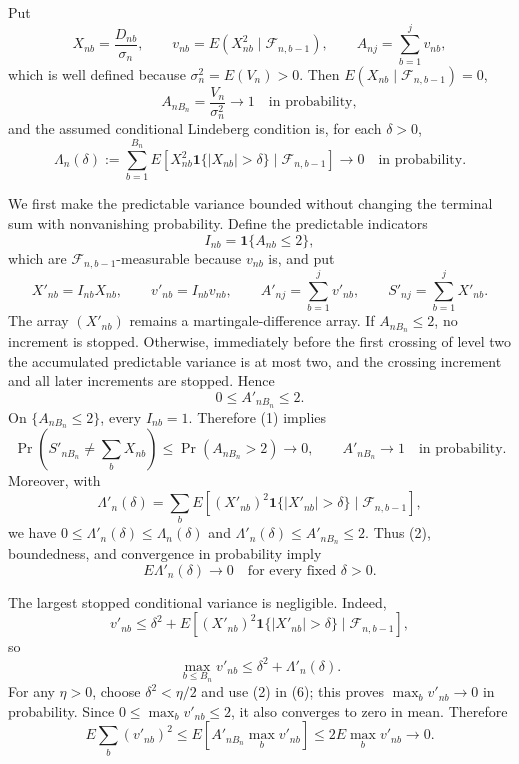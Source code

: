 Put
\[
X_{nb}=\frac{D_{nb}}{\sigma_n},\qquad
v_{nb}=E(X_{nb}^2\mid\mathcal F_{n,b-1}),\qquad
A_{nj}=\sum_{b=1}^{j}v_{nb},
\]
which is well defined because \(\sigma_n^2=E(V_n)>0\). Then \(E(X_{nb}\mid\mathcal F_{n,b-1})=0\),
\[
A_{nB_n}=\frac{V_n}{\sigma_n^2}\longrightarrow1
\quad\text{in probability},
\tag{1}
\]
and the assumed conditional Lindeberg condition is, for each \(\delta>0\),
\[
\Lambda_n(\delta):=\sum_{b=1}^{B_n}
E\!\left[X_{nb}^2\mathbf1\{|X_{nb}|>\delta\}\mid\mathcal F_{n,b-1}\right]
\longrightarrow0
\quad\text{in probability}.
\tag{2}
\]

We first make the predictable variance bounded without changing the terminal sum with nonvanishing probability. Define the predictable indicators
\[
I_{nb}=\mathbf1\{A_{nb}\le2\},
\]
which are \(\mathcal F_{n,b-1}\)-measurable because \(v_{nb}\) is, and put
\[
X'_{nb}=I_{nb}X_{nb},\qquad
v'_{nb}=I_{nb}v_{nb},\qquad
A'_{nj}=\sum_{b=1}^{j}v'_{nb},\qquad
S'_{nj}=\sum_{b=1}^{j}X'_{nb}.
\]
The array \((X'_{nb})\) remains a martingale-difference array. If \(A_{nB_n}\le2\), no increment is stopped. Otherwise, immediately before the first crossing of level two the accumulated predictable variance is at most two, and the crossing increment and all later increments are stopped. Hence
\[
0\le A'_{nB_n}\le2.
\tag{3}
\]
On \(\{A_{nB_n}\le2\}\), every \(I_{nb}=1\). Therefore (1) implies
\[
\Pr\!\left(S'_{nB_n}\ne\sum_bX_{nb}\right)
\le\Pr(A_{nB_n}>2)\longrightarrow0,
\qquad
A'_{nB_n}\longrightarrow1
\quad\text{in probability}.
\tag{4}
\]
Moreover, with
\[
\Lambda'_n(\delta)=\sum_bE\!\left[(X'_{nb})^2
\mathbf1\{|X'_{nb}|>\delta\}\mid\mathcal F_{n,b-1}\right],
\]
we have \(0\le\Lambda'_n(\delta)\le\Lambda_n(\delta)\) and \(\Lambda'_n(\delta)\le A'_{nB_n}\le2\). Thus (2), boundedness, and convergence in probability imply
\[
E\Lambda'_n(\delta)\longrightarrow0
\quad\text{for every fixed }\delta>0.
\tag{5}
\]

The largest stopped conditional variance is negligible. Indeed,
\[
v'_{nb}
\le \delta^2+E\!\left[(X'_{nb})^2
\mathbf1\{|X'_{nb}|>\delta\}\mid\mathcal F_{n,b-1}\right],
\]
so
\[
\max_{b\le B_n}v'_{nb}\le\delta^2+\Lambda'_n(\delta).
\tag{6}
\]
For any \(\eta>0\), choose \(\delta^2<\eta/2\) and use (2) in (6); this proves \(\max_bv'_{nb}\to0\) in probability. Since \(0\le\max_bv'_{nb}\le2\), it also converges to zero in mean. Therefore
\[
E\sum_b(v'_{nb})^2
\le E\!\left[A'_{nB_n}\max_bv'_{nb}\right]
\le2E\max_bv'_{nb}\longrightarrow0.
\tag{7}
\]

